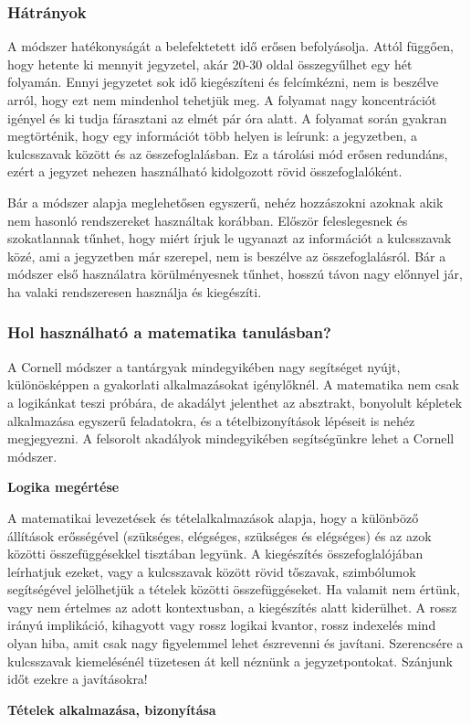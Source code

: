\documentclass[../Main.tex]{subfiles}
\begin{document}
\subsubsection{Hátrányok}

\begin{flushleft}
    A módszer hatékonyságát a belefektetett idő erősen befolyásolja. Attól függően, hogy
hetente ki mennyit jegyzetel, akár 20-30 oldal összegyűlhet egy hét folyamán. Ennyi
jegyzetet sok idő kiegészíteni és felcímkézni, nem is beszélve arról, hogy ezt nem
mindenhol tehetjük meg. A folyamat nagy koncentrációt igényel és ki tudja fárasztani az
elmét pár óra alatt. A folyamat során gyakran megtörténik, hogy egy információt több
helyen is leírunk: a jegyzetben, a kulcsszavak között és az összefoglalásban. Ez a tárolási
mód erősen redundáns, ezért a jegyzet nehezen használható kidolgozott rövid
összefoglalóként.

Bár a módszer alapja meglehetősen egyszerű, nehéz hozzászokni azoknak akik nem
hasonló rendszereket használtak korábban. Először feleslegesnek és szokatlannak tűnhet,
hogy miért írjuk le ugyanazt az információt a kulcsszavak közé, ami a jegyzetben már
szerepel, nem is beszélve az összefoglalásról. Bár a módszer első használatra
körülményesnek tűnhet, hosszú távon nagy előnnyel jár, ha valaki rendszeresen használja
és kiegészíti.
\end{flushleft}

\subsubsection{Hol használható a matematika tanulásban?}

\begin{flushleft}
A Cornell módszer a tantárgyak mindegyikében nagy segítséget nyújt, különösképpen a
gyakorlati alkalmazásokat igénylőknél. A matematika nem csak a logikánkat teszi próbára,
de akadályt jelenthet az absztrakt, bonyolult képletek alkalmazása egyszerű feladatokra, és
a tételbizonyítások lépéseit is nehéz megjegyezni. A felsorolt akadályok mindegyikében
segítségünkre lehet a Cornell módszer.
\end{flushleft}
\textbf{Logika megértése}


\begin{flushleft}
    A matematikai levezetések és tételalkalmazások alapja, hogy a különböző állítások
erősségével (szükséges, elégséges, szükséges és elégséges) és az azok közötti
összefüggésekkel tisztában legyünk. A kiegészítés összefoglalójában leírhatjuk ezeket,
vagy a kulcsszavak között rövid tőszavak, szimbólumok segítségével jelölhetjük a tételek
közötti összefüggéseket. Ha valamit nem értünk, vagy nem értelmes az adott
kontextusban, a kiegészítés alatt kiderülhet. A rossz irányú implikáció, kihagyott vagy
rossz logikai kvantor, rossz indexelés mind olyan hiba, amit csak nagy figyelemmel lehet
észrevenni és javítani. Szerencsére a kulcsszavak kiemelésénél tüzetesen át kell néznünk a
jegyzetpontokat. Szánjunk időt ezekre a javításokra!
\end{flushleft}
\textbf{Tételek alkalmazása, bizonyítása}
\end{document}
